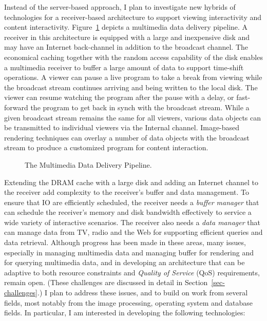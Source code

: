 Instead of the server-based approach, I plan to investigate
new hybrids of technologies for 
a receiver-based architecture to support viewing interactivity 
and content interactivity. Figure~\ref{fig-dtv-pipeline} depicts a 
multimedia data delivery pipeline.  A receiver in this architecture
is equipped with a large and inexpensive disk and may have an 
Internet back-channel in addition to the broadcast channel.
The economical caching together with the random
access capability of the disk enables a multimedia receiver to 
buffer a large amount of data to support
time-shift operations.  A viewer can pause a live 
program to take a break from viewing while the broadcast
stream continues arriving and being written to the local disk.
The viewer can resume watching the program after the pause
with a delay, or fast-forward the program to get back in synch with
the broadcast stream.  
While a given broadcast stream remains the same
for all viewers, various data objects can be transmitted to
individual viewers via the Internal channel.
Image-based rendering techniques can
overlay a number of data objects with the broadcast stream to
produce a customized program for content
interaction.

\begin{figure}[t]
\epsfxsize=350pt
\centerline{}
\caption{The Multimedia Data Delivery Pipeline.}
\label{fig-dtv-pipeline}
\vspace{.1in}
\end{figure}

Extending the DRAM cache with a large disk and
adding an Internet channel to the receiver add complexity to 
the receiver's buffer and data management. To ensure that IO 
are efficiently scheduled, the receiver needs a 
{\em buffer manager} that can schedule the
receiver's memory and
disk bandwidth effectively to service
a wide variety of interactive scenarios.
The receiver also needs a {\em data manager}
that can manage data from TV, radio and the Web
for supporting efficient queries and data
retrieval. Although progress has been made in these areas,
many issues, especially in managing multimedia
data and managing buffer for rendering and
for querying multimedia data,
and in developing an architecture that can be adaptive
to both resource constraints and {\em Quality of
Service} (QoS) requirements, remain open.
(These challenges are discussed
in detail in Section~\ref{sec-challenges}.)
I plan to address these issues, and to build on
work from several fields, most notably from the
image processing, operating system and database fields.
In particular, I am interested in developing the
following technologies:
                             
